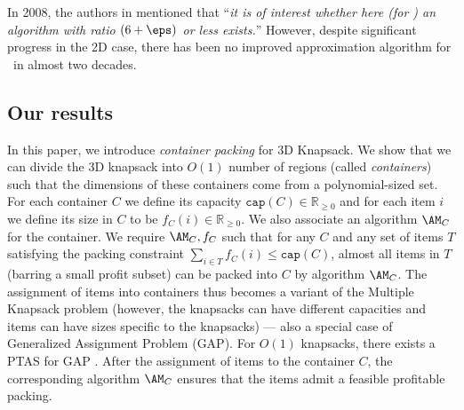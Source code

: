 In 2008, the authors in \cite{3d-knapsack} mentioned that ``{\em it is of interest whether here (for \tdk) an algorithm with ratio $(6+\eps)$ or less exists.}''
However, despite significant progress in the 2D case, there has been no improved approximation algorithm for \tdk~in almost two decades. 
\subsection{Our results}
In this paper, we introduce {\em container packing} for 3D Knapsack. We show that we can divide the 3D knapsack into $O(1)$ number of regions  (called {\em containers}) such that the dimensions of these containers come from a polynomial-sized set. 
For each container $C$ we define its capacity  $\mathtt{cap}(C) \in \mathbb{R}_{\ge 0}$ and for each item $i$ we define its size in $C$ to be $f_C(i) \in \mathbb{R}_{\ge 0}$. 
We also associate an algorithm $\AM_C$ for the container.
We require $\AM_C, f_C$  such that for any $C$ and any set of items $T$ satisfying the packing constraint $\sum_{i\in T} f_C(i) \le \mathtt{cap}(C)$, almost all items in $T$ (barring a small profit subset) can be packed into $C$ by algorithm $\AM_C$. 
The assignment of items into containers thus becomes a variant of the Multiple Knapsack problem (however, the knapsacks can have different capacities and items can have sizes specific to the knapsacks) --- also a special case of Generalized Assignment Problem (GAP). 
For $O(1)$ knapsacks, there exists a PTAS for GAP \cite{2dks-Lpacking}.
After the assignment of items to the container $C$, the corresponding algorithm $\AM_C$ ensures that the items admit a feasible profitable packing.

